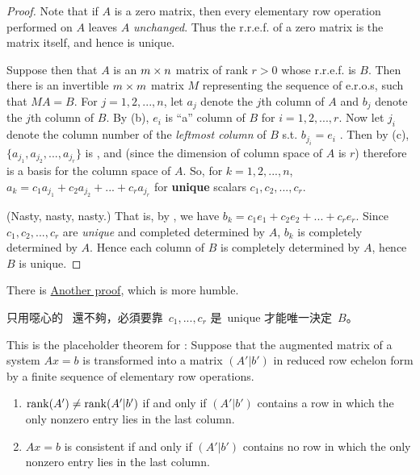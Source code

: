 \begin{proof}
Note that if \(A\) is a zero matrix, then every elementary row operation performed on \(A\) leaves \(A\) \emph{unchanged}.
Thus the r.r.e.f. of a zero matrix is the matrix itself, and hence is unique.

Suppose then that \(A\) is an \(m \times n\) matrix of rank \(r > 0\) whose r.r.e.f. is \(B\).
Then there is an invertible \(m \times m\) matrix \(M\) representing the sequence of e.r.o.s, such that \(MA = B\).
For \(j = 1, 2, ..., n\), let \(a_j\) denote the \(j\)th column of \(A\) and \(b_j\) denote the \(j\)th column of \(B\).
By (b), \(e_i\) is ``a'' column of \(B\) for \(i = 1, 2, ..., r\).
Now let \(j_i\) denote the column number of the \emph{leftmost column} of \(B\) s.t. \(b_{j_i} = e_i\) .
Then by (c), \(\{ a_{j_1}, a_{j_2}, ..., a_{j_r} \}\) is \LID{}, and (since the dimension of column space of \(A\) is \(r\)) therefore is a basis for the column space of \(A\).
So, for \(k = 1, 2, ..., n\), \(a_k = c_1 a_{j_1} + c_2 a_{j_2} + ... + c_r a_{j_r}\) for \textbf{unique} scalars \(c_1, c_2, ..., c_r\).

(Nasty, nasty, nasty.)
That is, by , we have \(b_k = c_1 e_1 + c_2 e_2 + ... + c_r e_r\).
Since \(c_1, c_2, ..., c_r\) are \emph{unique} and completed determined by \(A\), \(b_k\) is completely determined by \(A\).
Hence each column of \(B\) is completely determined by \(A\), hence \(B\) is unique.
\end{proof}

\begin{note}
There is \href{https://www.youtube.com/watch?v=EcgaeUUYV1U&ab_channel=DrPeyam}{Another proof}, which is more humble.
\end{note}

\begin{note}
只用噁心的\  還不夠，必須要靠\ \(c_1, ..., c_r\) 是\ unique 才能唯一決定\ \(B\)。
\end{note}

\begin{additional theorem} \label{athm 3.16}
This is the placeholder theorem for :
Suppose that the augmented matrix of a system \(Ax = b\) is transformed into a matrix \((A'|b')\) in reduced row echelon form by a finite sequence of elementary row operations.
\begin{enumerate}
\item \(\mathrm{rank}(A') \ne \mathrm{rank}(A'|b')\) if and only if \((A'|b')\) contains a row in which the only nonzero entry lies in the last column.
\item \(Ax = b\) is consistent if and only if \((A'|b')\) contains no row in which the only nonzero entry lies in the last column.
\end{enumerate}
\end{additional theorem}

